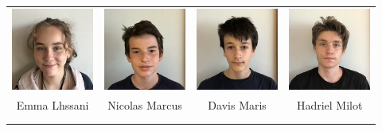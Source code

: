 \begin{center}
\begin{tabular}{cccc}
\includegraphics[angle=270,origin=c, width=27mm]{eleves/Lhssani Emma.JPG} &
\includegraphics[angle=270,origin=c, width=27mm]{eleves/Marcus Nicolas.JPG} &
\includegraphics[angle=270,origin=c, width=27mm]{eleves/Maris David.JPG} &
\includegraphics[angle=270,origin=c, width=27mm]{eleves/Milot Hadriel.JPG} \\
Emma Lhssani & Nicolas Marcus & Davis Maris & Hadriel Milot \\ \\ \\ 


\end{tabular}
\end{center}

